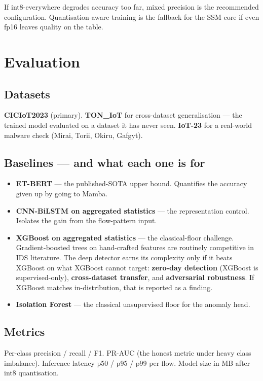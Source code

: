 \documentclass[11pt,a4paper]{article}
\begin{document}
If int8-everywhere degrades accuracy too far, mixed precision is the recommended configuration. Quantisation-aware training is the fallback for the SSM core if even fp16 leaves quality on the table.

\section{Evaluation}

\subsection{Datasets}
\textbf{CICIoT2023} (primary). \textbf{TON\_IoT} for cross-dataset generalisation --- the trained model evaluated on a dataset it has never seen. \textbf{IoT-23} for a real-world malware check (Mirai, Torii, Okiru, Gafgyt).

\subsection{Baselines --- and what each one is for}
\begin{itemize}[leftmargin=*, itemsep=2pt]
  \item \textbf{ET-BERT} --- the published-SOTA upper bound. Quantifies the accuracy given up by going to Mamba.
  \item \textbf{CNN-BiLSTM on aggregated statistics} --- the representation control. Isolates the gain from the flow-pattern input.
  \item \textbf{XGBoost on aggregated statistics} --- the classical-floor challenge. Gradient-boosted trees on hand-crafted features are routinely competitive in IDS literature. The deep detector earns its complexity only if it beats XGBoost on what XGBoost cannot target: \textbf{zero-day detection} (XGBoost is supervised-only), \textbf{cross-dataset transfer}, and \textbf{adversarial robustness}. If XGBoost matches in-distribution, that is reported as a finding.
  \item \textbf{Isolation Forest} --- the classical unsupervised floor for the anomaly head.
\end{itemize}

\subsection{Metrics}
Per-class precision / recall / F1. PR-AUC (the honest metric under heavy class imbalance). Inference latency p50 / p95 / p99 per flow. Model size in MB after int8 quantisation.
\end{document}
